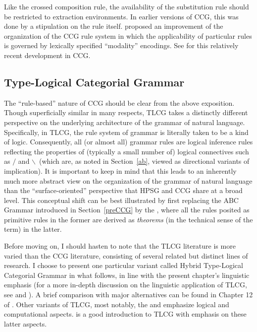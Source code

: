 \documentclass[output=paper
                ,modfonts
 	        ,biblatex
                ,babelshorthands
                ,newtxmath
                ,draftmode
                ,colorlinks, citecolor=brown
]{langscibook}
\begin{document}
Like the crossed composition rule, the availability of the
substitution rule should be restricted to extraction environments. In
earlier versions of CCG, this was done by a stipulation on
the rule itself. \citet{Baldridge2002a-u} proposed an improvement of the
organization of the CCG rule system in which the applicability of
particular rules is governed by lexically specified ``modality''
encodings. See \citet{steedman2011ccg} for this relatively recent
development in CCG.

\subsection{Type-Logical Categorial Grammar \label{sectlg}}

The ``rule-based'' nature of CCG should be clear from the above
exposition. Though superficially similar in many respects,
TLCG takes a distinctly different perspective on the
underlying architecture of the grammar of natural language.
Specifically, in TLCG, the rule system of grammar is literally taken
to be a kind of logic. Consequently, all (or almost all) grammar rules are logical
inference rules reflecting the properties of (typically a small number
of) logical connectives such as \ensuremath{/} and
\ensuremath{\backslash}\ (which are, as noted in Section~\ref{ab}, viewed as
directional variants of implication).
It is important to keep in mind that this leads to
an inherently much more abstract view on the
organization of the grammar of natural language than the
``surface-oriented'' perspective that HPSG and CCG share
at a broad level. This conceptual shift can be
best illustrated by first replacing the ABC Grammar introduced in
Section~\ref{preCCG} by the , where all the rules
posited as primitive rules in the former are derived as \emph{theorems} (in
the technical sense of the term) in the latter.

Before moving on, I should hasten to note that the TLCG literature is
more varied than the CCG literature, consisting of several related but
distinct lines of research. I choose to present one particular variant
called Hybrid Type-Logical Categorial Grammar \citep{KubotaLevineBook}
in what follows, in line with the present chapter's linguistic
emphasis (for a more in-depth discussion on the linguistic application
of TLCG, see \citealt{Carpenter98a-u} and \citealt{KubotaLevineBook}).
A brief comparison with major alternatives
can be found in Chapter 12 of \citet{KubotaLevineBook}. 
Other variants of TLCG, most notably, the
 \citep{Moortgat2011a-u} and
 \citep{morrill2011} emphasize logical
and computational aspects. \citet{mootretore2012} is a good
introduction to TLCG with emphasis on these latter aspects.
\end{document}

